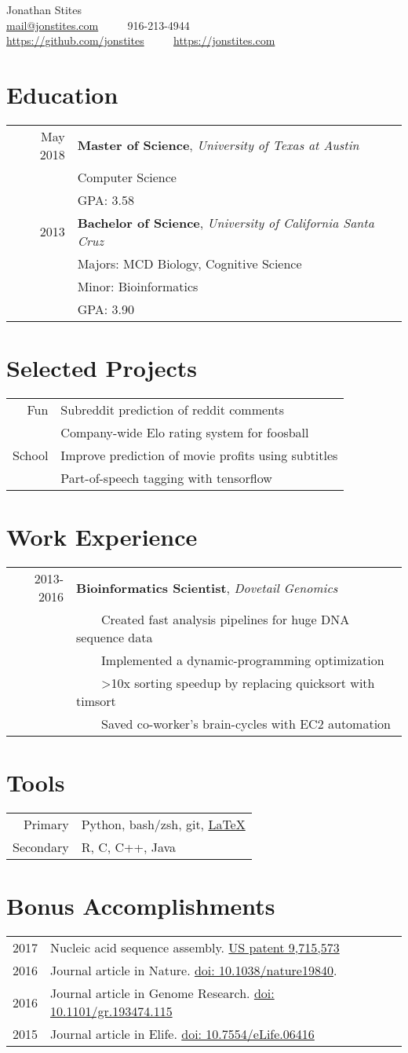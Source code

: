 \documentclass[12pt]{extarticle}
\makeatletter
\newcommand{\tabitem}{~~\llap{\textbullet}~~}
\newcommand*{\email}{
	\href{mailto:mail+resume@jonstites.com }{mail@jonstites.com}
	}
\newcommand*{\phone}{
	916-213-4944
	}
\newcommand*{\github}{
	{\href{https://github.com/jonstites}{https://github.com/jonstites}}
}
\newcommand*{\website}{
	{\href{https://jonstites.com}{https://jonstites.com}}
}
\newcommand*{\Contact}{
	\begin{center}
		\Huge Jonathan Stites \\
	    \small \email \tabitem \phone \\
	    \github \tabitem \website \\
	\end{center}
}
\newcommand*{\Education}{
	\section{Education}
	\begin{tabular}{rl}
		May 2018  & \textbf{Master of Science}, \textit{University of Texas at Austin} \\
				  & Computer Science \\
          		  & GPA: 3.58 \\
		2013 	  & \textbf{Bachelor of Science}, \textit{University of California Santa Cruz} \\
				  & Majors: MCD Biology, Cognitive Science \\
		  		  & Minor: Bioinformatics \\
				  & GPA: 3.90 \\
\end{tabular}
}
\newcommand*{\Projects}{
	\section{Selected Projects}
	\begin{tabular}{rl}
	Fun & Subreddit prediction of reddit comments \\
		& Company-wide Elo rating system for foosball \\
	School & Improve prediction of movie profits using subtitles\\
           & Part-of-speech tagging with tensorflow \\
	\end{tabular}
}
\newcommand*{\Tools}{
	\section{Tools}
	\begin{tabular}{rl}
	Primary   & Python, bash/zsh, git, 
			  \href{http://stevehanov.ca/blog/resume_comic.png}{\LaTeX} \\
	Secondary & R, C, C++, Java \\
	\end{tabular}
}
\newcommand*{\Work}{
	\section{Work Experience}
	\begin{tabular}{rl}
	2013-2016 & \textbf{Bioinformatics Scientist}, 
			    \textit{Dovetail Genomics} \\
	   & \tabitem Created fast analysis pipelines for huge DNA sequence data \\
	   & \tabitem Implemented a dynamic-programming optimization \\
	   & \tabitem >10x sorting speedup by replacing quicksort with timsort \\
	   & \tabitem Saved co-worker's brain-cycles with EC2 automation \\

	\end{tabular}
}
\newcommand*{\Bonus}{
	\section{Bonus Accomplishments}
	\begin{tabular}{rl}
	2017 & Nucleic acid sequence assembly.
	\href{https://patents.google.com/patent/US9715573B2}
	{US patent 9,715,573} \\
	2016 & 
	Journal article in Nature.
	\href{https://www.ncbi.nlm.nih.gov/pubmed/27762356}
	{doi: 10.1038/nature19840}. \\
	2016 & 
	Journal article in Genome Research.
	\href{https://www.ncbi.nlm.nih.gov/pubmed/26848124}
	{doi: 10.1101/gr.193474.115} \\
	2015 & 
	Journal article in Elife.
	\href{https://www.ncbi.nlm.nih.gov/pubmed/25919952}
	{doi: 10.7554/eLife.06416}
	\end{tabular}
}
\makeatother
\begin{document}
\Contact
\Education
\Projects
\Work
\Tools
\Bonus
\end{document}

